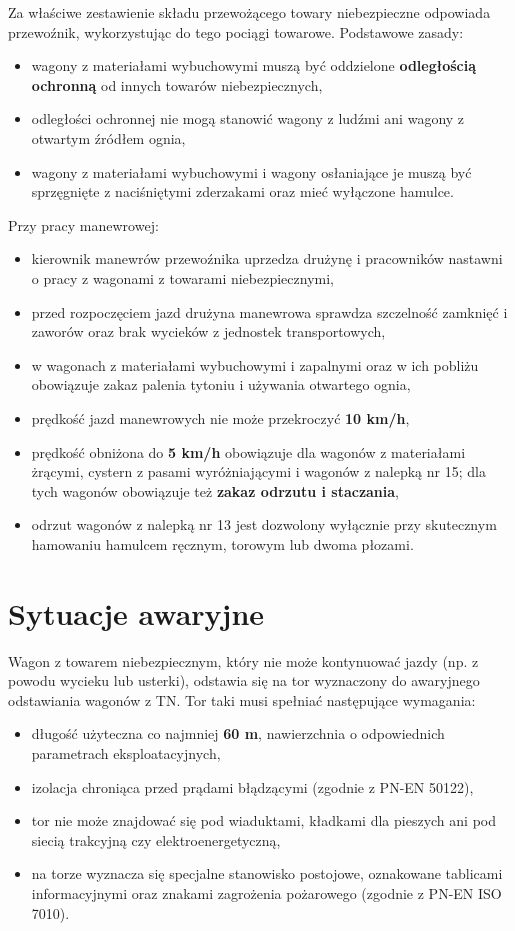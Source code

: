 Za właściwe zestawienie składu przewożącego towary niebezpieczne odpowiada przewoźnik, wykorzystując do tego pociągi towarowe. Podstawowe zasady:
\begin{itemize}
	\item wagony z materiałami wybuchowymi muszą być oddzielone \textbf{odległością ochronną} od innych towarów niebezpiecznych,
	\item odległości ochronnej nie mogą stanowić wagony z ludźmi ani wagony z otwartym źródłem ognia,
	\item wagony z materiałami wybuchowymi i wagony osłaniające je muszą być sprzęgnięte z naciśniętymi zderzakami oraz mieć wyłączone hamulce.
\end{itemize}

Przy pracy manewrowej:
\begin{itemize}
	\item kierownik manewrów przewoźnika uprzedza drużynę i pracowników nastawni o pracy z wagonami z towarami niebezpiecznymi,
	\item przed rozpoczęciem jazd drużyna manewrowa sprawdza szczelność zamknięć i zaworów oraz brak wycieków z jednostek transportowych,
	\item w wagonach z materiałami wybuchowymi i zapalnymi oraz w ich pobliżu obowiązuje zakaz palenia tytoniu i używania otwartego ognia,
	\item prędkość jazd manewrowych nie może przekroczyć \textbf{10 km/h},
	\item prędkość obniżona do \textbf{5 km/h} obowiązuje dla wagonów z materiałami żrącymi, cystern z pasami wyróżniającymi i wagonów z nalepką nr 15; dla tych wagonów obowiązuje też \textbf{zakaz odrzutu i staczania},
	\item odrzut wagonów z nalepką nr 13 jest dozwolony wyłącznie przy skutecznym hamowaniu hamulcem ręcznym, torowym lub dwoma płozami.
\end{itemize}

\section{Sytuacje awaryjne}

Wagon z towarem niebezpiecznym, który nie może kontynuować jazdy (np. z powodu wycieku lub usterki), odstawia się na tor wyznaczony do awaryjnego odstawiania wagonów z TN. Tor taki musi spełniać następujące wymagania:
\begin{itemize}
	\item długość użyteczna co najmniej \textbf{60 m}, nawierzchnia o odpowiednich parametrach eksploatacyjnych,
	\item izolacja chroniąca przed prądami błądzącymi (zgodnie z PN-EN 50122),
	\item tor nie może znajdować się pod wiaduktami, kładkami dla pieszych ani pod siecią trakcyjną czy elektroenergetyczną,
	\item na torze wyznacza się specjalne stanowisko postojowe, oznakowane tablicami informacyjnymi oraz znakami zagrożenia pożarowego (zgodnie z PN-EN ISO 7010).
\end{itemize}

